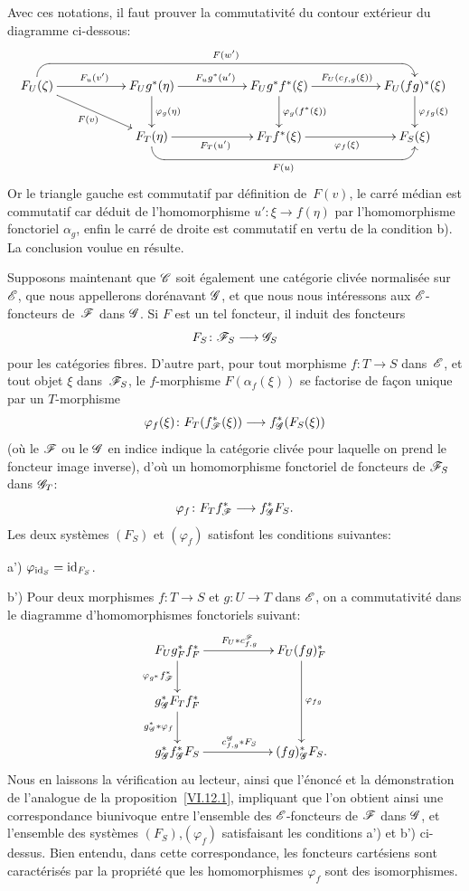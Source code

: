 Avec ces notations, il faut prouver la commutativit\'e du contour
ext\'erieur du diagramme ci-dessous:
$$
\xymatrix{ F_U(\zeta) \ar@{-<} `u[r] `[rrrrrr]^{F(w')} [rrrrrr]
\ar[rr]^{F_u(v')} \ar[drr]_{F(v)} & & F_Ug^*(\eta)
\ar[rr]^{F_ug^*(u')} \ar[d]^{\varphi_g(\eta)} & & F_Ug^*f^*(\xi)
\ar[rr]^{F_U(c_{f,g}(\xi))}\ar[d]^{\varphi_g(f^*(\xi))}& &
F_U(fg)^*(\xi) \ar[d]^{\varphi_{fg}(\xi)} \\ & & F_T(\eta) \ar@{-<}
`d[r] `[rrrr]_{F(u)} [rrrr] \ar[rr]_{F_T(u')} & & F_Tf^*(\xi)
\ar[rr]_{\varphi_f(\xi)} & & F_S(\xi) }
$$
Or le triangle gauche est commutatif par d\'efinition de~$F(v)$, le
carr\'e m\'edian est commutatif car d\'eduit de l'homomorphisme
$u'\colon \xi\to f(\eta)$ par l'homomorphisme fonctoriel $\alpha_g$,
enfin le carr\'e de droite est commutatif en vertu de la condition
b). La conclusion voulue en r\'esulte.

Supposons maintenant que $\cal{C}$ soit \'egalement une
cat\'egorie cliv\'ee normalis\'ee sur~$\cal{E}$, que nous
appellerons dor\'enavant $\cal{G}$, et que nous nous int\'eressons
aux $\cal{E}$-foncteurs de~$\cal{F}$ dans $\cal{G}$. Si $F$ est un tel
foncteur, il induit des foncteurs
$$
F_S\colon \cal{F}_S\to\cal{G}_S
$$
pour les cat\'egories fibres. D'autre part, pour tout morphisme
$f\colon T\to S$ dans~$\cal{E}$, et tout objet $\xi$ dans~$\cal{F}_S$,
le $f$-morphisme $F(\alpha_f(\xi))$ se factorise de fa\c con unique
par un $T$-morphisme
$$
\varphi_f(\xi)\colon F_T(f^*_{\cal{F}}(\xi))\to
f^*_{\cal{G}}(F_S(\xi))
$$
(o\`u le $\cal{F}$ ou le $\cal{G}$ en indice indique la
cat\'egorie cliv\'ee pour laquelle on prend le foncteur image
inverse), d'o\`u un homomorphisme fonctoriel de foncteurs de
$\cal{F}_S$ dans $\cal{G}_T$:
$$
\varphi_f\colon F_T f^*_{\cal{F}}\to f^*_{\cal{G}}F_S.
$$
Les deux syst\`emes $(F_S)$ et $(\varphi_f)$ satisfont les
conditions suivantes:

a') $\varphi_{\mathrm{id}_S}=\mathrm{id}_{F_S}$.

b') Pour deux morphismes $f\colon T\to S$ et $g\colon U\to T$ dans
$\cal{E}$, on a commutativit\'e dans le diagramme d'homomorphismes
fonctoriels suivant:
$$
\xymatrix{{F_Ug_F^*f_F^*}\ar[rr]^{F_U *c_{f,g}^\cal{F}}\ar[d]_{\varphi_{g^*}f^*_{\cal{F}}}& &{F_U(fg)^*_F}\ar[dd]^{\varphi_{fg}}\\{g^*_{\cal{G}}F_Tf^*_F}\ar[d]_{g^*_{\cal{G}}*\varphi_f}& & \\{g^*_{\cal{G}}f^*_{\cal{G}}F_S}\ar[rr]^{c_{f,g}^\cal{G}*F_S}& &{(fg)^*_{\cal{G}}F_S.}}
$$
Nous en laissons la v\'erification au lecteur, ainsi que
l'\'enonc\'e et la d\'emonstration de l'analogue de la
proposition~\ref{VI.12.1}, impliquant que l'on obtient ainsi une
correspondance biunivoque entre l'ensemble des $\cal{E}$-foncteurs de
$\cal{F}$ dans $\cal{G}$, et l'ensemble des syst\`emes
$(F_S)$,$(\varphi_f)$ satisfaisant les conditions a') et b')
ci-dessus. Bien entendu, dans cette correspondance, les foncteurs
cart\'esiens sont caract\'eris\'es par la propri\'et\'e que
les homomorphismes $\varphi_f$ sont des isomorphismes.

